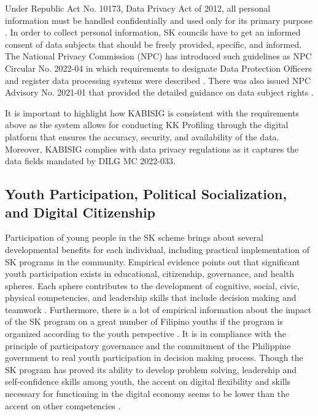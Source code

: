 \hspace*{\parindent}Under Republic Act No. 10173, Data Privacy Act of 2012, all personal information must be handled confidentially and used only for its primary purpose \cite{AT}. In order to collect personal information, SK councils have to get an informed consent of data subjects that should be freely provided, specific, and informed. The National Privacy Commission (NPC) has introduced such guidelines as NPC Circular No. 2022-04 in which requirements to designate Data Protection Officers and register data processing systems were described \cite{AH}. There was also issued NPC Advisory No. 2021-01 that provided the detailed guidance on data subject rights \cite{AG}.
\vspace{5mm}

\hspace*{\parindent}It is important to highlight how KABISIG is consistent with the requirements above as the system allows for conducting KK Profiling through the digital platform that ensures the accuracy, security, and availability of the data. Moreover, KABISIG complies with data privacy regulations as it captures the data fields mandated by DILG MC 2022-033.
\vspace{5mm}

\subsection{Youth Participation, Political Socialization, and Digital Citizenship}

\hspace*{\parindent}Participation of young people in the SK scheme brings about several developmental benefits for each individual, including practical implementation of SK programs in the community. Empirical evidence points out that significant youth participation exists in educational, citizenship, governance, and health spheres. Each sphere contributes to the development of cognitive, social, civic, physical competencies, and leadership skills that include decision making and teamwork \cite{I}. Furthermore, there is a lot of empirical information about the impact of the SK program on a great number of Filipino youths if the program is organized according to the youth perspective \cite{G}. It is in compliance with the principle of participatory governance and the commitment of the Philippine government to real youth participation in decision making process. Though the SK program has proved its ability to develop problem solving, leadership and self-confidence skills among youth, the accent on digital flexibility and skills necessary for functioning in the digital economy seems to be lower than the accent on other competencies \cite{AP}.
\vspace{5mm}

